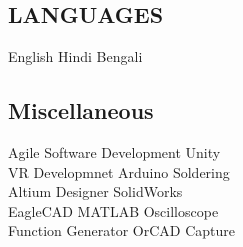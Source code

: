 \documentclass[]{deedy-resume-openfont}
\begin{document}
\begin{minipage}[t]{0.31\textwidth}
\subsection{LANGUAGES}
English \textbullet{} Hindi \textbullet{} Bengali \\
\sectionsep

\subsection{Miscellaneous}
Agile Software Development \textbullet{} Unity\\
VR Developmnet \textbullet{} Arduino \textbullet{} Soldering \\
Altium Designer \textbullet{} SolidWorks\\
EagleCAD \textbullet{} MATLAB \textbullet{} Oscilloscope\\
Function Generator \textbullet{} OrCAD Capture \\

%
%

\end{minipage} 
\hfill
\end{document}
